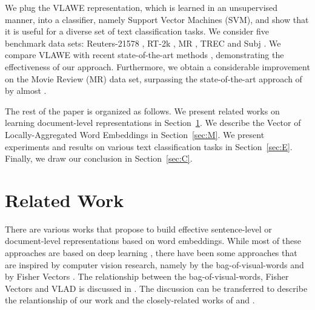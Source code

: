 \documentclass[11pt,a4paper]{article}
\begin{document}
We plug the VLAWE representation, which is learned in an unsupervised manner, into a classifier, namely Support Vector Machines (SVM), and show that it is useful for a diverse set of text classification tasks. We consider five benchmark data sets: Reuters-21578 \cite{reuters-21578}, RT-2k \cite{Pang-ACL-2004}, MR \cite{Pang-ACL-2005}, TREC \cite{Li-COLING-2002} and Subj \cite{Pang-ACL-2004}. We compare VLAWE with recent state-of-the-art methods \cite{Ionescu-KES-2017,Cheng-IJCAI-2018,Fu-ESA-2018,Hill-NAACL-2016,Iyyer-ACL-2015,Kim-EMNLP-2014,Kiros-NIPS-2015,Le-ICML-2014,Liu-IJCAI-2017,Shen-ACL-2018,Torki-ACL-2018,Xue-TKDE-2009,Zhao-IJCAI-2015,Zhou-COLING-2016,Zhou-IJCAI-2018}, demonstrating the effectiveness of our approach. Furthermore, we obtain a considerable improvement on the Movie Review (MR) data set, surpassing the state-of-the-art approach of  by almost .

The rest of the paper is organized as follows. We present related works on learning document-level representations in Section~\ref{sec:RW}. We describe the Vector of Locally-Aggregated Word Embeddings in Section~\ref{sec:M}. We present experiments and results on various text classification tasks in Section~\ref{sec:E}. Finally, we draw our conclusion in Section~\ref{sec:C}.

\vspace*{-0.1cm}
\section{Related Work}
\label{sec:RW}
\vspace*{-0.1cm}

There are various works \cite{Ionescu-KES-2017,Cheng-IJCAI-2018,Conneau-EMNLP-2017,Fu-ESA-2018,Hill-NAACL-2016,Iyyer-ACL-2015,Kim-EMNLP-2014,Kiros-NIPS-2015,Kusner-ICML-2015,Le-ICML-2014,Perronnin-ACL-2013,Shen-ACL-2018,Torki-ACL-2018,Zhao-IJCAI-2015,Zhou-IJCAI-2018} that propose to build effective sentence-level or document-level representations based on word embeddings. While most of these approaches are based on deep learning \cite{Cheng-IJCAI-2018,Conneau-EMNLP-2017,Hill-NAACL-2016,Iyyer-ACL-2015,Kim-EMNLP-2014,Kiros-NIPS-2015,Le-ICML-2014,Zhao-IJCAI-2015,Zhou-IJCAI-2018}, there have been some approaches that are inspired by computer vision research, namely by the bag-of-visual-words \cite{Ionescu-KES-2017} and by Fisher Vectors \cite{Perronnin-ACL-2013}. The relationship between the bag-of-visual-words, Fisher Vectors and VLAD is discussed in \cite{Jegou-PAMI-2012}. The discussion can be transferred to describe the relantionship of our work and the closely-related works of  and .
\end{document}

